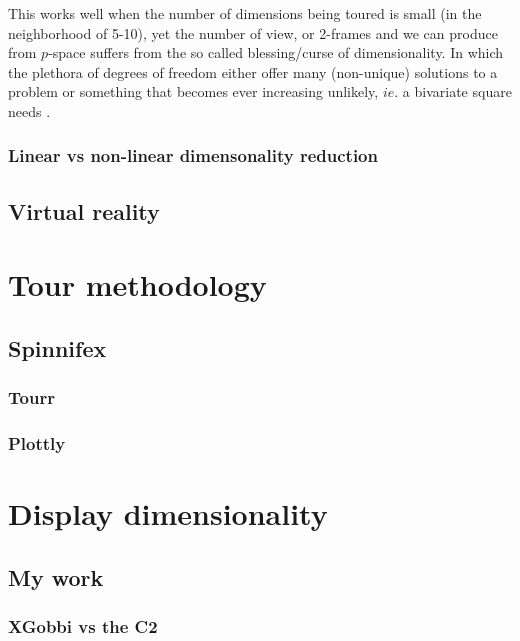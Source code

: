 \documentclass{monashthesis}
\begin{document}
This works well when the number of dimensions being toured is small (in
the neighborhood of 5-10), yet the number of view, or 2-frames and we
can produce from \(p\)-space suffers from the so called blessing/curse
of dimensionality. In which the plethora of degrees of freedom either
offer many (non-unique) solutions to a problem or something that becomes
ever increasing unlikely, \(ie.\) a bivariate square needs .

\subsection{Linear vs non-linear dimensonality
reduction}\label{linear-vs-non-linear-dimensonality-reduction}

\section{Virtual reality}\label{virtual-reality}

\chapter{Tour methodology}\label{ch:tour}

\section{Spinnifex}\label{spinnifex}

\subsection{Tourr}\label{tourr}

\subsection{Plottly}\label{plottly}

\chapter{Display dimensionality}\label{ch:disp_dim}

\section{My work}\label{my-work}

\subsection{XGobbi vs the C2}\label{xgobbi-vs-the-c2}
\end{document}
